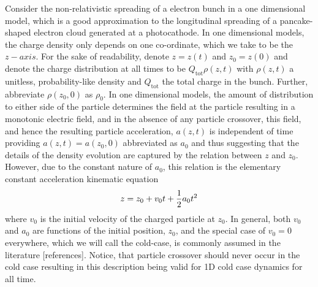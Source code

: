 \documentclass[aps,prl,twocolumn,showpacs,superscriptaddress,groupedaddress]{revtex4-1}  %
\begin{document}
{Consider 
the non-relativistic spreading of a electron bunch in a one dimensional model, which is a good approximation 
to the longitudinal spreading of a pancake-shaped electron cloud generated at a photocathode. 
In one dimensional models, the charge density only depends on 
one co-ordinate, which we take to be the $z-axis$.  For the sake of readability,
denote $z = z(t)$ and $z_0 = z(0)$ and denote the charge distribution at all times to
be $Q_\text{tot} \rho(z,t)$ with $\rho(z,t)$ 
a unitless, probability-like density and  
$Q_\text{tot}$  the total charge in the bunch.  Further, abbreviate $\rho(z_0,0)$ as $\rho_0$.
In one dimensional models, the amount of distribution to either side of the particle 
determines the field at the particle resulting in a monotonic electric field, and in the absence of any particle crossover, this field, and hence the resulting
particle acceleration, $a(z,t)$ is independent of time providing
$a(z,t) = a(z_0,0)$ abbreviated as $a_0$ and thus suggesting that
the details of the density evolution are captured by the relation between
$z$ and $z_0$.
However, due to the constant nature of $a_0$, this 
relation is the elementary constant acceleration kinematic equation
\begin{equation}\label{eq:non-relativistic position}
  z = z_0 + v_0 t + {1\over 2} a_0 t^2
\end{equation}
where $v_0$ is the initial velocity of the charged particle at $z_0$.  In general,
both $v_0$ and $a_0$ are functions of the initial position, $z_0$, and the special case of $v_0 = 0$ everywhere, which we will call the cold-case,
is commonly assumed in the literature [references].  Notice, that particle crossover should never occur in the cold case resulting in this description being valid
for 1D cold case dynamics for all time. 

}
\end{document}
